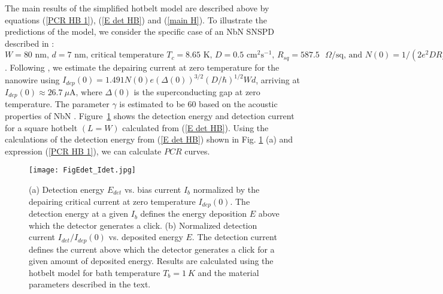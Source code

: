 \documentclass[%
reprint,
 amsmath,amssymb,
aps,
pra,
]{revtex4-1}
\begin{document}
\quad The main results of the simplified hotbelt model are described above by equations (\ref{PCR HB 1}), (\ref{E det HB}) and (\ref{main H}). To illustrate the predictions of the model, we consider the specific case of an NbN SNSPD described in \cite{korzh_demonstrating_2018}: \(W=80 \text{ nm, }d=7 \text{ nm, critical temperature }T_c=8.65\text{ K, }D=0.5 \text{ cm}^2 \text{s}^{-1} \text{, } R_{sq}=587.5\text{ }\Omega/\text{sq} \text{, and } N(0)=1/(2e^2 DR_{sq} d)= 15.2\cdot 10^{21} \text{ cm}^{-3} \text{eV}^{-1}\).  Following \cite{kupriyanov_m._yu._temperature_1980}, we estimate the depairing current at zero temperature for the nanowire using \(I_{dep}(0)=1.491N(0)e\left(\Delta(0)\right)^{3/2} (D/\hbar)^{1/2} Wd \), arriving at \(I_{dep}(0)\approx 26.7\:\mu\text{A, where } \Delta(0)\) is the superconducting gap at zero temperature. The parameter \(\gamma\) is estimated to be 60 based on the acoustic properties of NbN \cite{zou_hexagonal-structured_2015}. Figure~\ref{F HB Cutoff} shows the detection energy and detection current for a square hotbelt \(\left(L = W\right)\) calculated from (\ref{E det HB}). Using the calculations of the detection energy from (\ref{E det HB}) shown in Fig. \ref{F HB Cutoff} (a) and expression (\ref{PCR HB 1}), we can calculate \(PCR\) curves.

\begin{figure}
\texttt{[image: FigEdet\_Idet.jpg]} 
\caption{(a) Detection energy \(E_{det}\) vs. bias current \(I_b\) normalized by the depairing critical current at zero temperature \(I_{dep}(0)\). The detection energy at a given \(I_b\) defines the energy deposition \(E\) above which the detector generates a click. (b) Normalized detection current \(I_{det}/I_{dep}(0)\) vs. deposited energy \(E\).  The detection current defines the current above which the detector generates a click for a given amount of deposited energy. Results are calculated using the hotbelt model for bath temperature \(T_b=1~K\) and the material parameters described in the text.}
\label{F HB Cutoff}
\end{figure}
\end{document}
